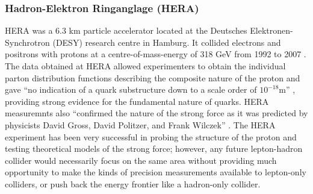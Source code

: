 \subsubsection{Hadron-Elektron Ringanglage (HERA)}
HERA was a 6.3 km particle accelerator located at the Deutsches Elektronen-Synchrotron (DESY) research centre in Hamburg. It collided electrons and positrons with protons at a centre-of-mass-energy of 318 GeV from 1992 to 2007 \cite{PHYS:HERA}. The data obtained at HERA allowed experimenters to obtain the individual parton distribution functions describing the composite nature of the proton and gave ``no indication of a quark substructure down to a scale order of $10^{-18}$m'' \cite{SPS:HERA}, providing strong evidence for the fundamental nature of quarks. HERA measuremnts also ``confirmed the nature of the strong force as it was predicted by physicists David Gross, David Politzer, and Frank Wilczek'' \cite{PHYS:HERA}. The HERA experiment has been very successful in probing the structure of the proton and testing theoretical models of the strong force; however, any future lepton-hadron collider would necessarily focus on the same area without providing much opportunity to make the kinds of precision measurements available to lepton-only colliders, or push back the energy frontier like a hadron-only collider.
